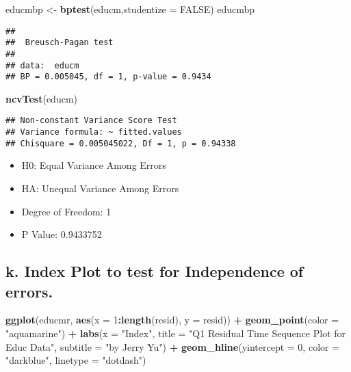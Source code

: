 \documentclass[
]{article}
\newenvironment{Shaded}{\begin{snugshade}}{\end{snugshade}}
\newcommand{\AttributeTok}[1]{\textcolor[rgb]{0.13,0.29,0.53}{#1}}
\newcommand{\ConstantTok}[1]{\textcolor[rgb]{0.56,0.35,0.01}{#1}}
\newcommand{\DecValTok}[1]{\textcolor[rgb]{0.00,0.00,0.81}{#1}}
\newcommand{\FunctionTok}[1]{\textcolor[rgb]{0.13,0.29,0.53}{\textbf{#1}}}
\newcommand{\NormalTok}[1]{#1}
\newcommand{\OtherTok}[1]{\textcolor[rgb]{0.56,0.35,0.01}{#1}}
\newcommand{\SpecialCharTok}[1]{\textcolor[rgb]{0.81,0.36,0.00}{\textbf{#1}}}
\newcommand{\StringTok}[1]{\textcolor[rgb]{0.31,0.60,0.02}{#1}}
\begin{document}
\begin{Shaded}
\begin{Highlighting}[]
\NormalTok{educmbp }\OtherTok{\textless{}{-}} \FunctionTok{bptest}\NormalTok{(educm,}\AttributeTok{studentize =} \ConstantTok{FALSE}\NormalTok{)}
\NormalTok{educmbp}
\end{Highlighting}
\end{Shaded}

\begin{verbatim}
## 
##  Breusch-Pagan test
## 
## data:  educm
## BP = 0.005045, df = 1, p-value = 0.9434
\end{verbatim}

\begin{Shaded}
\begin{Highlighting}[]
\FunctionTok{ncvTest}\NormalTok{(educm)}
\end{Highlighting}
\end{Shaded}

\begin{verbatim}
## Non-constant Variance Score Test 
## Variance formula: ~ fitted.values 
## Chisquare = 0.005045022, Df = 1, p = 0.94338
\end{verbatim}

\begin{itemize}
\item
  H0: Equal Variance Among Errors
\item
  HA: Unequal Variance Among Errors
\item
  Degree of Freedom: 1
\item
  P Value: 0.9433752
\end{itemize}

\hypertarget{k.-index-plot-to-test-for-independence-of-errors.}{%
\subsection{k. Index Plot to test for Independence of
errors.}\label{k.-index-plot-to-test-for-independence-of-errors.}}

\begin{Shaded}
\begin{Highlighting}[]
\FunctionTok{ggplot}\NormalTok{(educmr, }\FunctionTok{aes}\NormalTok{(}\AttributeTok{x =} \DecValTok{1}\SpecialCharTok{:}\FunctionTok{length}\NormalTok{(resid), }\AttributeTok{y =}\NormalTok{ resid)) }\SpecialCharTok{+}
  \FunctionTok{geom\_point}\NormalTok{(}\AttributeTok{color =} \StringTok{"aquamarine"}\NormalTok{) }\SpecialCharTok{+}
  \FunctionTok{labs}\NormalTok{(}\AttributeTok{x =} \StringTok{"Index"}\NormalTok{,}
       \AttributeTok{title =} \StringTok{"Q1 Residual Time Sequence Plot for Educ Data"}\NormalTok{,}
       \AttributeTok{subtitle =} \StringTok{"by Jerry Yu"}\NormalTok{) }\SpecialCharTok{+}
  \FunctionTok{geom\_hline}\NormalTok{(}\AttributeTok{yintercept =} \DecValTok{0}\NormalTok{,}
             \AttributeTok{color =} \StringTok{"darkblue"}\NormalTok{,}
             \AttributeTok{linetype =} \StringTok{"dotdash"}\NormalTok{)}
\end{Highlighting}
\end{Shaded}
\end{document}
